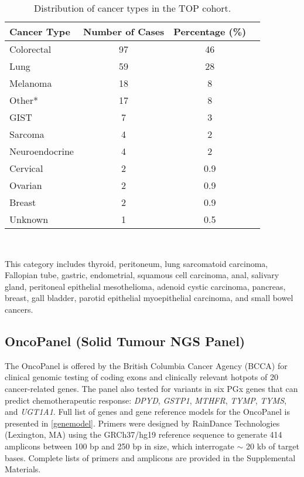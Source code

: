 \begin{table}[H]
\caption{Distribution of cancer types in the TOP cohort.}
\label{cancertypes}
\centering
      \begin{tabular}{lccc}
        \hline
        Cancer Type & Number of Cases & Percentage (\%) \\ \hline
        Colorectal & 97 & 46 \\
        Lung & 59 & 28 \\
        Melanoma & 18 & 8 \\
				Other* & 17 & 8 \\
				GIST & 7 & 3 \\
				Sarcoma & 4 & 2 \\
				Neuroendocrine & 4 & 2 \\
				Cervical & 2 & 0.9 \\
				Ovarian & 2 & 0.9 \\
				Breast & 2 & 0.9 \\
				Unknown & 1 & 0.5 \\ \hline
      \end{tabular} \\
			\vspace{0.5cm}
\raggedright
{\small *This category includes thyroid, peritoneum, lung sarcomatoid carcinoma, Fallopian tube, gastric, endometrial, squamous cell carcinoma, anal, salivary gland, peritoneal epithelial mesothelioma, adenoid cystic carcinoma, pancreas, breast, gall bladder, parotid epithelial myoepithelial carcinoma, and small bowel cancers.}
\end{table}

\subsection{OncoPanel (Solid Tumour NGS Panel)}

The OncoPanel is offered by the British Columbia Cancer Agency (BCCA) for clinical genomic testing of coding exons and clinically relevant hotpots of 20 cancer-related genes. The panel also tested for variants in six PGx genes that can predict chemotherapeutic response: \textit{DPYD}, \textit{GSTP1}, \textit{MTHFR}, \textit{TYMP}, \textit{TYMS}, and \textit{UGT1A1}. Full list of genes and gene reference models for the OncoPanel is presented in \autoref{genemodel}. Primers were designed by RainDance Technologies (Lexington, MA) using the GRCh37/hg19 reference sequence to generate 414 amplicons between 100 bp and 250 bp in size, which interrogate $\sim$ 20 kb of target bases. Complete lists of primers and amplicons are provided in the Supplemental Materials.

